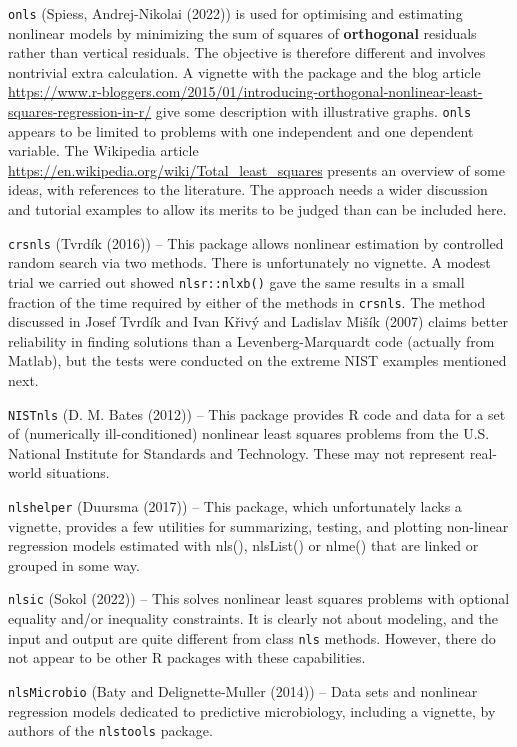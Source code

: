 \texttt{onls} (Spiess, Andrej-Nikolai (2022)) is used for optimising and estimating nonlinear models
by minimizing the sum of squares of \textbf{orthogonal} residuals rather than vertical
residuals. The objective is therefore different and involves nontrivial extra
calculation. A vignette with the package and the blog article
\url{https://www.r-bloggers.com/2015/01/introducing-orthogonal-nonlinear-least-squares-regression-in-r/}
give some description with illustrative graphs. \texttt{onls} appears to be limited to
problems with one independent and one dependent variable. The Wikipedia article
\url{https://en.wikipedia.org/wiki/Total_least_squares} presents an overview of some
ideas, with references to the literature. The approach needs a wider
discussion and tutorial examples to allow its merits to be judged than can be
included here.

\texttt{crsnls} (Tvrdík (2016)) -- This package allows nonlinear estimation by
controlled random search via two methods. There is unfortunately no vignette.
A modest trial we carried out showed \texttt{nlsr::nlxb()} gave the same results in
a small fraction of the time required by either of the methods in \texttt{crsnls}. The
method discussed in Josef Tvrdík and Ivan Křivý and Ladislav Mišík (2007) claims better reliability in finding solutions
than a Levenberg-Marquardt code (actually from Matlab), but the tests were conducted
on the extreme NIST examples mentioned next.

\texttt{NISTnls} (D. M. Bates (2012)) -- This package provides R code and data for a set of
(numerically ill-conditioned) nonlinear least squares problems from the U.S. National
Institute for Standards and Technology. These may not represent real-world situations.

\texttt{nlshelper} (Duursma (2017)) -- This package, which unfortunately lacks a
vignette, provides a few utilities for summarizing, testing, and plotting
non-linear regression models estimated with nls(), nlsList() or nlme() that
are linked or grouped in some way.

\texttt{nlsic} (Sokol (2022)) -- This solves nonlinear least squares problems with optional
equality and/or inequality constraints. It is clearly not about modeling, and
the input and output are quite different from class \texttt{nls} methods. However, there do
not appear to be other R packages with these capabilities.

\texttt{nlsMicrobio} (Baty and Delignette-Muller (2014)) -- Data sets and nonlinear regression models
dedicated to predictive microbiology, including a vignette, by authors of the
\texttt{nlstools} package.

